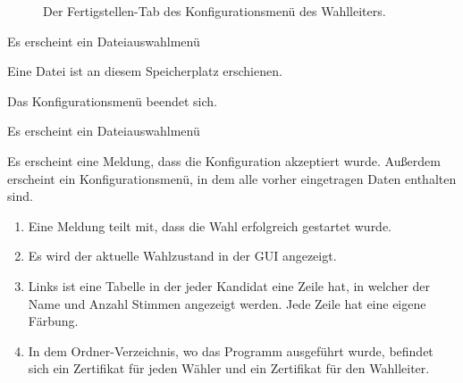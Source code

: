 \documentclass[parskip=full]{scrartcl}
\begin{document}
\begin{figure}[h!]
	\caption{\label{fig:sup_configuration_complete}
		Der Fertigstellen-Tab des Konfigurationsmenü des Wahlleiters.
	}
\end{figure}


		{Es erscheint ein Dateiauswahlmenü}

		{Eine Datei ist an diesem Speicherplatz erschienen.}

		{Das Konfigurationsmenü beendet sich.}

		{Es erscheint ein Dateiauswahlmenü}

		{Es erscheint eine Meldung, dass die Konfiguration akzeptiert wurde. Außerdem erscheint ein Konfigurationsmenü, in dem alle vorher eingetragen Daten enthalten sind.}

		{\begin{enumerate}
				\item Eine Meldung teilt mit, dass die Wahl erfolgreich gestartet wurde.
				\item Es wird der aktuelle Wahlzustand in der GUI angezeigt.
				\item Links ist eine Tabelle in der jeder Kandidat eine Zeile hat, in welcher der Name und Anzahl Stimmen angezeigt werden. Jede Zeile hat eine eigene Färbung.
				\item In dem Ordner-Verzeichnis, wo das Programm ausgeführt wurde, befindet sich ein Zertifikat für jeden Wähler und ein Zertifikat für den Wahlleiter.
		\end{enumerate}}
	
\end{document}
